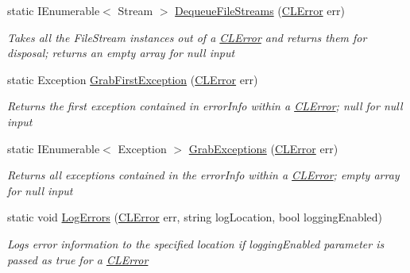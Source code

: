 \begin{DoxyCompactItemize}
\item 
static I\-Enumerable$<$ Stream $>$ \hyperlink{class_cloud_api_public_1_1_model_1_1_c_l_error_a8dae51e34bafa27b7d769cdf6687bd62}{Dequeue\-File\-Streams} (\hyperlink{class_cloud_api_public_1_1_model_1_1_c_l_error}{C\-L\-Error} err)
\begin{DoxyCompactList}\small\item\em Takes all the File\-Stream instances out of a \hyperlink{class_cloud_api_public_1_1_model_1_1_c_l_error}{C\-L\-Error} and returns them for disposal; returns an empty array for null input \end{DoxyCompactList}\item 
static Exception \hyperlink{class_cloud_api_public_1_1_model_1_1_c_l_error_a3d89191c40991d6b674afd7a8711ddb4}{Grab\-First\-Exception} (\hyperlink{class_cloud_api_public_1_1_model_1_1_c_l_error}{C\-L\-Error} err)
\begin{DoxyCompactList}\small\item\em Returns the first exception contained in error\-Info within a \hyperlink{class_cloud_api_public_1_1_model_1_1_c_l_error}{C\-L\-Error}; null for null input \end{DoxyCompactList}\item 
static I\-Enumerable$<$ Exception $>$ \hyperlink{class_cloud_api_public_1_1_model_1_1_c_l_error_a7433212facaa0bd0f742680f3a9b7417}{Grab\-Exceptions} (\hyperlink{class_cloud_api_public_1_1_model_1_1_c_l_error}{C\-L\-Error} err)
\begin{DoxyCompactList}\small\item\em Returns all exceptions contained in the error\-Info within a \hyperlink{class_cloud_api_public_1_1_model_1_1_c_l_error}{C\-L\-Error}; empty array for null input \end{DoxyCompactList}\item 
static void \hyperlink{class_cloud_api_public_1_1_model_1_1_c_l_error_a1b826b5af362da00b84ae97b090a140e}{Log\-Errors} (\hyperlink{class_cloud_api_public_1_1_model_1_1_c_l_error}{C\-L\-Error} err, string log\-Location, bool logging\-Enabled)
\begin{DoxyCompactList}\small\item\em Logs error information to the specified location if logging\-Enabled parameter is passed as true for a \hyperlink{class_cloud_api_public_1_1_model_1_1_c_l_error}{C\-L\-Error} \end{DoxyCompactList}\end{DoxyCompactItemize}
